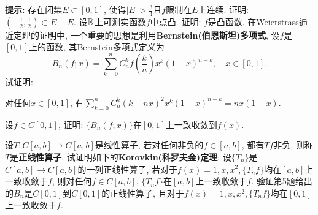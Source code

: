 \begin{quizb}
\textbf{提示: }存在闭集\(E\subset [0,1]\), 使得\(|E|>\frac{3}{4}\)且\(f\)限制在\(E\)上连续. 证明: \(\left(-\frac{1}{2},\frac{1}{2}\right)\subset E-E\).
\woe 设\(\mathbb{R}\)上可测实函数\(f\)中点凸. 证明: \(f\)是凸函数.
\woe 在Weierstrass逼近定理的证明中, 一个重要的思想是利用\textbf{Bernstein(伯恩斯坦)多项式}, 设\(f\)是\([0,1]\)上的函数, 其Bernstein多项式定义为\[B_n(f;x)=\sum_{k=0}^{n}C_n^kf\left(\frac{k}{n}\right)x^k(1-x)^{n-k},\quad x\in[0,1].\]试证明:\begin{quizs}
\item 对任何\(x\in[0,1]\), 有\(\sum_{k=0}^{n}C_n^k(k-nx)^2x^k(1-x)^{n-k}=nx(1-x).\)
\item 设\(f\in C[0,1]\), 证明: \(\{B_n(f;x)\}\)在\([0,1]\)上一致收敛到\(f(x)\).
\end{quizs}
\woe 设\(T: C[a,b]\rightarrow C[a,b]\)是线性算子, 若对任何非负的\(f\in[a,b]\), 都有\(Tf\)非负, 则称\(T\)是\textbf{正线性算子}. 试证明如下的\textbf{Korovkin(科罗夫金)定理}: 设\(\{T_n\}\)是\(C[a,b]\rightarrow C[a,b]\)的一列正线性算子, 若对于\(f(x)=1,x,x^2,\{T_nf\}\)均在\([a,b]\)上一致收敛于\(f\), 则对任何\(f\in C[a,b]\), \(\{T_nf\}\)在\([a,b]\)上一致收敛于\(f\).
\woe 验证第5题给出的\(B_n\)是\(C[0,1]\)到\(C[0,1]\)的正线性算子, 且对于\(f(x)=1,x,x^2,\{T_nf\}\)均在\([0,1]\)上一致收敛于\(f\).
\end{quizb}
